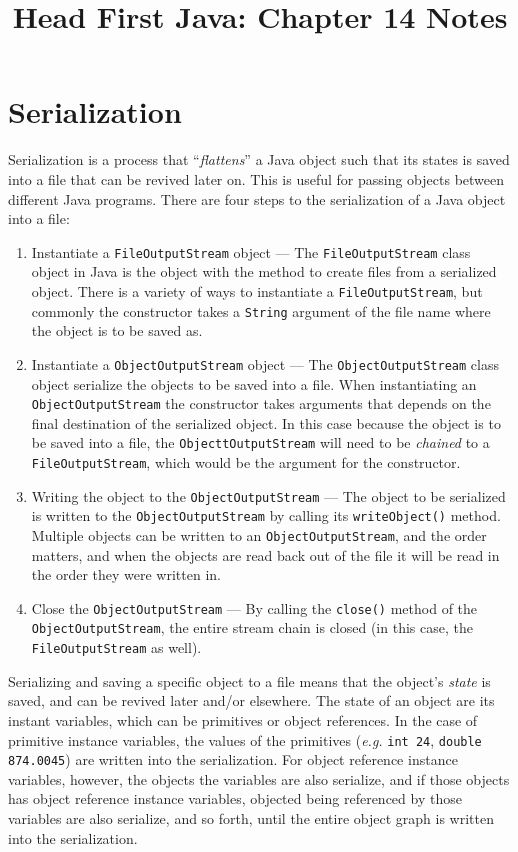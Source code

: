 \documentclass{tufte-handout}
\title{Head First Java: Chapter 14 Notes}
\begin{document}
    \maketitle

    \section*{Serialization}
    Serialization is a process that ``\emph{flattens}'' a Java object such that its states is saved into a file that can be revived later on. This is useful for passing objects between different Java programs. There are four steps to the serialization of a Java object into a file:

    \begin{enumerate}
        \item Instantiate a \texttt{FileOutputStream} object --- The \texttt{FileOutputStream} class object in Java is the object with the method to create files from a serialized object. There is a variety of ways to instantiate a \texttt{FileOutputStream}, but commonly the constructor takes a \texttt{String} argument of the file name where the object is to be saved as.
        \item Instantiate a \texttt{ObjectOutputStream} object --- The \texttt{ObjectOutputStream} class object serialize the objects to be saved into a file. When instantiating an \texttt{ObjectOutputStream} the constructor takes arguments that depends on the final destination of the serialized object. In this case because the object is to be saved into a file, the \texttt{ObjecttOutputStream} will need to be \emph{chained} to a \texttt{FileOutputStream}, which would be the argument for the constructor.
        \item Writing the object to the \texttt{ObjectOutputStream} --- The object to be serialized is written to the \texttt{ObjectOutputStream} by calling its \texttt{writeObject()} method. Multiple objects can be written to an \texttt{ObjectOutputStream}, and the order matters, and when the objects are read back out of the file it will be read in the order they were written in.
        \item Close the \texttt{ObjectOutputStream} --- By calling the \texttt{close()} method of the \texttt{ObjectOutputStream}, the entire stream chain is closed (in this case, the \texttt{FileOutputStream} as well).
    \end{enumerate}

    Serializing and saving a specific object to a file means that the object's \emph{state} is saved, and can be revived later and/or elsewhere. The state of an object are its instant variables, which can be primitives or object references. In the case of primitive instance variables, the values of the primitives (\textit{e.g.} \texttt{int 24}, \texttt{double 874.0045}) are written into the serialization. For object reference instance variables, however, the objects the variables are also serialize, and if those objects has object reference instance variables, objected being referenced by those variables are also serialize, and so forth, until the entire object graph is written into the serialization. 
\end{document}
